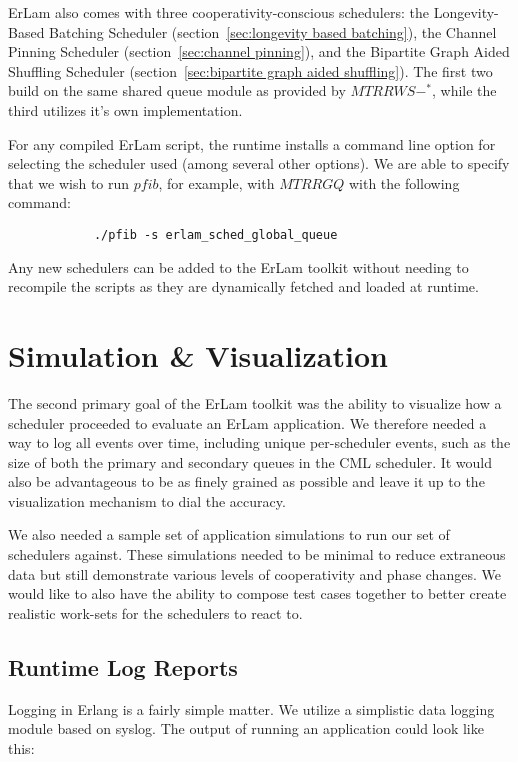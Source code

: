 ErLam also comes with three cooperativity-conscious schedulers: the 
Longevity-Based Batching Scheduler (section~\ref{sec:longevity based batching}),
the Channel Pinning Scheduler (section~\ref{sec:channel pinning}), and the
Bipartite Graph Aided Shuffling Scheduler (section~\ref{sec:bipartite graph aided shuffling}).
The first two build on the same shared queue module as provided by $MTRRWS-^{*}$, 
while the third utilizes it's own implementation.

For any compiled ErLam script, the runtime installs a command line option for
selecting the scheduler used (among several other options). We are able to 
specify that we wish to run $pfib$, for example, with $MTRRGQ$ with
the following command:
\begin{verbatim}
            ./pfib -s erlam_sched_global_queue 
\end{verbatim}
\noindent
Any new schedulers can be added to the ErLam toolkit without needing to 
recompile the scripts as they are dynamically fetched and loaded at runtime. 

\section{Simulation \& Visualization}\label{sec:simulation and visualization}

The second primary goal of the ErLam toolkit was the ability to visualize 
how a scheduler proceeded to evaluate an ErLam application. We therefore needed
a way to log all events over time, including unique per-scheduler events, such 
as the size of both the primary and secondary queues in the CML scheduler. It 
would also be advantageous to be as finely grained as possible and leave it up to 
the visualization mechanism to dial the accuracy.

We also needed a sample set of application simulations to run our set of 
schedulers against. These simulations needed to be minimal to reduce
extraneous data but still demonstrate various levels of cooperativity and phase 
changes. We would like to also have the ability to compose test cases 
together to better create realistic work-sets for the schedulers to react to.

\subsection{Runtime Log Reports}\label{sec:runtime log reports}

Logging in Erlang is a fairly simple matter. We utilize a simplistic data 
logging module based on syslog. The output of running an application 
could look like this:

